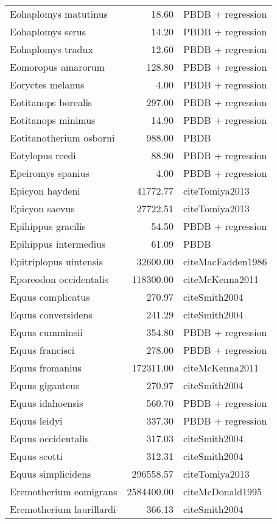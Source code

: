 \begin{table}[ht]
\begin{tabular}{lrl}
  Eohaplomys matutinus & 18.60 & PBDB + regression \\ 
  Eohaplomys serus & 14.20 & PBDB + regression \\ 
  Eohaplomys tradux & 12.60 & PBDB + regression \\ 
  Eomoropus amarorum & 128.80 & PBDB + regression \\ 
  Eoryctes melanus & 4.00 & PBDB + regression \\ 
  Eotitanops borealis & 297.00 & PBDB + regression \\ 
  Eotitanops minimus & 14.90 & PBDB + regression \\ 
  Eotitanotherium osborni & 988.00 & PBDB \\ 
  Eotylopus reedi & 88.90 & PBDB + regression \\ 
  Epeiromys spanius & 4.00 & PBDB + regression \\ 
  Epicyon haydeni & 41772.77 & cite{Tomiya2013} \\ 
  Epicyon saevus & 27722.51 & cite{Tomiya2013} \\ 
  Epihippus gracilis & 54.50 & PBDB + regression \\ 
  Epihippus intermedius & 61.09 & PBDB \\ 
  Epitriplopus uintensis & 32600.00 & cite{MacFadden1986} \\ 
  Eporeodon occidentalis & 118300.00 & cite{McKenna2011} \\ 
  Equus complicatus & 270.97 & cite{Smith2004} \\ 
  Equus conversidens & 241.29 & cite{Smith2004} \\ 
  Equus cumminsii & 354.80 & PBDB + regression \\ 
  Equus francisci & 278.00 & PBDB + regression \\ 
  Equus fromanius & 172311.00 & cite{McKenna2011} \\ 
  Equus giganteus & 270.97 & cite{Smith2004} \\ 
  Equus idahoensis & 560.70 & PBDB + regression \\ 
  Equus leidyi & 337.30 & PBDB + regression \\ 
  Equus occidentalis & 317.03 & cite{Smith2004} \\ 
  Equus scotti & 312.31 & cite{Smith2004} \\ 
  Equus simplicidens & 296558.57 & cite{Tomiya2013} \\ 
  Eremotherium eomigrans & 2584400.00 & cite{McDonald1995} \\ 
  Eremotherium laurillardi & 366.13 & cite{Smith2004} \\ 

\end{tabular}
\end{table}
